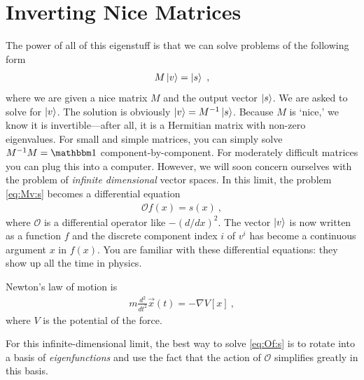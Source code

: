 \documentclass[12pt, oneside]{report}    %
\let\oldsection\section
\def\section{%
  \setcounter{sidenote}{1}%
  \oldsection
}
\begin{document}
\section{Inverting Nice Matrices}
\label{sec:inverting:nice:matrices}

The power of all of this eigenstuff is that we can solve problems of the following form
\begin{align}
    M \left|v\right\rangle = \left|s\right\rangle \ ,
    \label{eq:Mv:s}
\end{align}
where we are given a nice matrix $M$ and the output vector $\left|s\right\rangle$. We are asked to solve for $\left|v\right\rangle$. The solution is obviously $\left|v\right\rangle = M^{-1} \left|s\right\rangle$. Because $M$ is `nice,' we know it is invertible---after all, it is a Hermitian matrix with non-zero eigenvalues. For small and simple matrices, you can simply solve $M\inv M = \one$ component-by-component. For moderately difficult matrices you can plug this into a computer. However, we will soon concern ourselves with the problem of \emph{infinite dimensional} vector spaces. In this limit, the problem \eqref{eq:Mv:s} becomes a differential equation 
\begin{align}
    \mathcal O f(x) = s(x) \ ,
    \label{eq:Of:s}
\end{align}
where $\mathcal O$ is a differential operator like $-(d/dx)^2$. The vector $\left|v\right\rangle$ is now written as a function $f$ and the discrete component index $i$ of $v^i$ has become a continuous argument $x$ in $f(x)$. You are familiar with these differential equations: they show up all the time in physics. 
\begin{example}
Newton's law of motion is
\begin{align}
    m\frac{d^2}{dt^2} \vec{x}(t) = -\nabla V[x] \ ,
\end{align}
where $V$ is the potential of the force. 
\end{example}
For this infinite-dimensional limit, the best way to solve \eqref{eq:Of:s} is to rotate into a basis of \emph{eigenfunctions} and use the fact that the action of $\mathcal O$ simplifies greatly in this basis.
\end{document}
